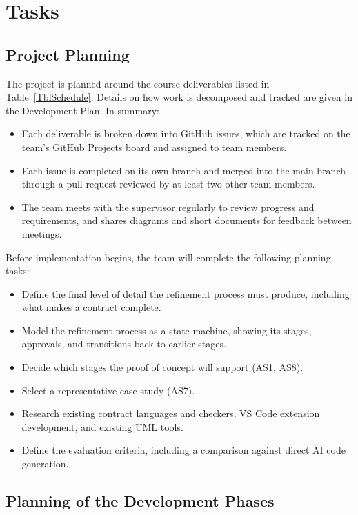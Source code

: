 \documentclass[12pt]{article}
\begin{document}
\section{Tasks}
\subsection{Project Planning}

The project is planned around the course deliverables listed in
Table~\ref{TblSchedule}. Details on how work is decomposed and tracked are given
in the Development Plan. In summary:

\begin{itemize}
  \item Each deliverable is broken down into GitHub issues, which are tracked
  on the team's GitHub Projects board and assigned to team members.
  \item Each issue is completed on its own branch and merged into the main
  branch through a pull request reviewed by at least two other team members.
  \item The team meets with the supervisor regularly to review progress and
  requirements, and shares diagrams and short documents for feedback between
  meetings.
\end{itemize}

Before implementation begins, the team will complete the following planning
tasks:

\begin{itemize}
  \item Define the final level of detail the refinement process must produce,
  including what makes a contract complete.
  \item Model the refinement process as a state machine, showing its stages,
  approvals, and transitions back to earlier stages.
  \item Decide which stages the proof of concept will support (AS1, AS8).
  \item Select a representative case study (AS7).
  \item Research existing contract languages and checkers, VS Code extension
  development, and existing UML tools.
  \item Define the evaluation criteria, including a comparison against direct
  AI code generation.
\end{itemize}

\subsection{Planning of the Development Phases}
\end{document}
